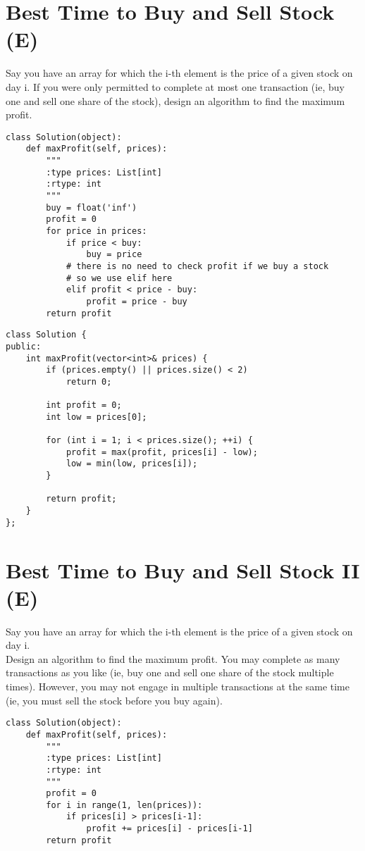 \section{Best Time to Buy and Sell Stock (E)}
Say you have an array for which the i-th element is the price of a given stock on day i. If you were only permitted to complete at most one transaction (ie, buy one and sell one share of the stock), design an algorithm to find the maximum profit.\\

\begin{lstlisting}
class Solution(object):
    def maxProfit(self, prices):
        """
        :type prices: List[int]
        :rtype: int
        """
        buy = float('inf')
        profit = 0
        for price in prices:
            if price < buy:
                buy = price
            # there is no need to check profit if we buy a stock
            # so we use elif here
            elif profit < price - buy:
                profit = price - buy
        return profit
\end{lstlisting}

\begin{lstlisting}
class Solution {
public:
    int maxProfit(vector<int>& prices) {
        if (prices.empty() || prices.size() < 2)
            return 0;
        
        int profit = 0;
        int low = prices[0];
        
        for (int i = 1; i < prices.size(); ++i) {
            profit = max(profit, prices[i] - low);
            low = min(low, prices[i]);
        }
        
        return profit;
    }
};
\end{lstlisting}


\section{Best Time to Buy and Sell Stock II (E)}
Say you have an array for which the i-th element is the price of a given stock on day i. \\

Design an algorithm to find the maximum profit. You may complete as many transactions as you like (ie, buy one and sell one share of the stock multiple times). However, you may not engage in multiple transactions at the same time (ie, you must sell the stock before you buy again). \\

\begin{lstlisting}
class Solution(object):
    def maxProfit(self, prices):
        """
        :type prices: List[int]
        :rtype: int
        """
        profit = 0
        for i in range(1, len(prices)):
            if prices[i] > prices[i-1]:
                profit += prices[i] - prices[i-1]
        return profit
\end{lstlisting}

